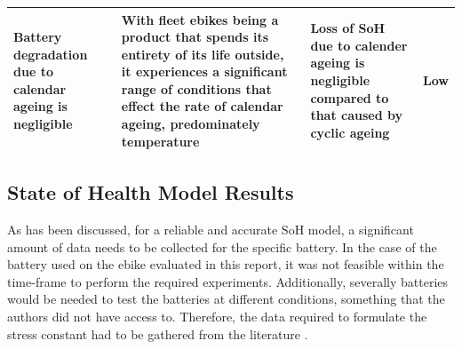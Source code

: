 \documentclass[a4paper, 10pt]{article}
\numberwithin{equation}{section}
\begin{document}
\begin{table}[H]
\begin{tabular}{|P{0.2\textwidth}|P{0.3\textwidth}|P{0.3\textwidth}|P{0.1\textwidth}|}
\\
\hline
Battery degradation due to calendar ageing is negligible & With fleet ebikes being a product that spends its entirety of its life outside, it experiences a significant range of conditions that effect the rate of calendar ageing, predominately temperature & Loss of SoH due to calender ageing is negligible compared to that caused by cyclic ageing & Low
\\
\hline
\end{tabular}
\end{table}







\subsection{State of Health Model Results}

As has been discussed, for a reliable and accurate SoH model, a significant amount of data needs to be collected for the specific battery. In the case of the battery used on the ebike evaluated in this report, it was not feasible within the time-frame to perform the required experiments. Additionally, severally batteries would be needed to test the batteries at different conditions, something that the authors did not have access to. Therefore, the data required to formulate the stress constant had to be gathered from the literature \cite{report:cho}\cite{web:batt_life}. %
\end{document}
